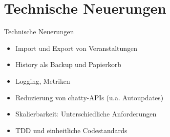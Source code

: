 \documentclass[10pt]{beamer}
\begin{document}
\section{Technische Neuerungen}
\begin{frame}{Technische Neuerungen}
	\begin{itemize}
		\item<+-> Import und Export von Veranstaltungen
		\item<+-> History als Backup und Papierkorb
		\item<+-> Logging, Metriken
		\item<+-> Reduzierung von chatty-APIs (u.a. Autoupdates)
		\item<+-> Skalierbarkeit: Unterschiedliche Anforderungen
		\item<+-> TDD und einheitliche Codestandards
	\end{itemize}
\end{frame}
\end{document}
